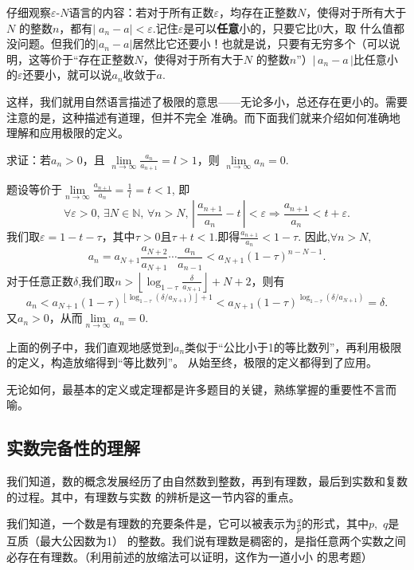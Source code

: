 仔细观察$\varepsilon  \text{-}N$语言的内容：若对于所有正数$\varepsilon$，均存在正整数$N$，使得对于所有大于$N$
的整数$n$，都有$|\;\!a_n-a|<\varepsilon$.记住$\varepsilon$是可以\textbf{任意}小的，只要它比0大，取
什么值都没问题。但我们的$|a_n-a|$居然比它还要小！也就是说，只要有无穷多个（可以说明，这等价于“存在正整数$N$，使得对于所有大于$N$
的整数$n$”）$|\,a_n-a\,|$比任意小的$\varepsilon$还要小，就可以说$a_n$收敛于$a$.


这样，我们就用自然语言描述了极限的意思——无论多小，总还存在更小的。需要注意的是，这种描述有道理，但并不完全
准确。而下面我们就来介绍如何准确地理解和应用极限的定义。
\begin{example}
    求证：若$a_n>0$，且 $\lim\limits_{n \to \infty}\frac{a_n}{a_{n+1}}=l>1$，则 $\lim\limits_{n \to \infty}a_n=0$.
\end{example}
\begin{prove}
    题设等价于$\lim\limits_{n \to \infty}\frac{a_{n+1}}{a_n}=\frac{1}{l}=t<1$,
    即
    \[
        \forall \varepsilon>0,\,\exists N\in \mathbb{N},\,\forall n>N,\,\left|\, \frac{a_{n+1}}{a_n}-t\, \right| <\varepsilon
        \Rightarrow \frac{a_{n+1}}{a_n}<t+\varepsilon
        .\]
    我们取$\varepsilon=1-t-\tau $，其中$\tau >0$且$\tau +t<1$.即得$\frac{a_{n+1}}{a_n}<1-\tau $.
    因此,$\forall n>N,$
    \[
        a_n=a_{N+1}\frac{a_{N+2}}{a_{N+1}}\cdots \frac{a_n}{a_{n-1}}<a_{N+1}(1-\tau)^{n-N-1}
        .\]
    对于任意正数$\delta$,我们取$n>\left\lfloor\log_{1-\tau}\frac{\delta}{\scriptstyle{a}_{{N+1}}}  \right\rfloor+N+2$，则有
    \[
        a_n<a_{N+1}(1-\tau)^{\left\lfloor \log_{1-\tau}(\delta / a_{N+1}) \right\rfloor+1}
        <a_{N+1}(1-\tau)^{\log_{1-\tau}(\delta / a_{N+1})}=\delta
        .\]
    又$a_n>0$，从而$\lim\limits_{n \to \infty}a_n=0$.
\end{prove}
上面的例子中，我们直观地感觉到$a_n$类似于“公比小于1的等比数列”，再利用极限的定义，构造放缩得到“等比数列”。
从始至终，极限的定义都得到了应用。


无论如何，最基本的定义或定理都是许多题目的关键，熟练掌握的重要性不言而喻。

\subsection{实数完备性的理解}
我们知道，数的概念发展经历了由自然数到整数，再到有理数，最后到实数和复数的过程。其中，有理数与实数
的辨析是这一节内容的重点。


我们知道，一个数是有理数的充要条件是，它可以被表示为$\frac{q}{p}$的形式，其中$p$,~$q$是互质（最大公因数为1）
的整数。我们说有理数是稠密的，是指任意两个实数之间必存在有理数。（利用前述的放缩法可以证明，这作为一道小小
的思考题）


